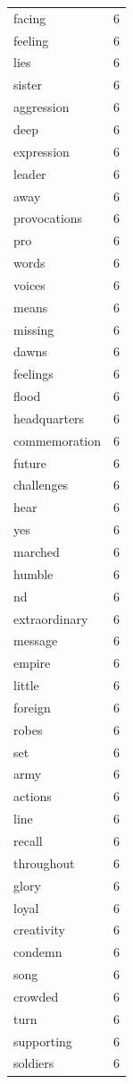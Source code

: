 \begin{tabular}{lr}
facing & 6 \\
feeling & 6 \\
lies & 6 \\
sister & 6 \\
aggression & 6 \\
deep & 6 \\
expression & 6 \\
leader & 6 \\
away & 6 \\
provocations & 6 \\
pro & 6 \\
words & 6 \\
voices & 6 \\
means & 6 \\
missing & 6 \\
dawns & 6 \\
feelings & 6 \\
flood & 6 \\
headquarters & 6 \\
commemoration & 6 \\
future & 6 \\
challenges & 6 \\
hear & 6 \\
yes & 6 \\
marched & 6 \\
humble & 6 \\
nd & 6 \\
extraordinary & 6 \\
message & 6 \\
empire & 6 \\
little & 6 \\
foreign & 6 \\
robes & 6 \\
set & 6 \\
army & 6 \\
actions & 6 \\
line & 6 \\
recall & 6 \\
throughout & 6 \\
glory & 6 \\
loyal & 6 \\
creativity & 6 \\
condemn & 6 \\
song & 6 \\
crowded & 6 \\
turn & 6 \\
supporting & 6 \\
soldiers & 6 \\

\end{tabular}
